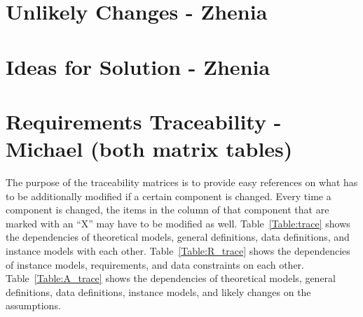 \documentclass[12pt]{article}
\begin{document}
\section{Unlikely Changes - Zhenia}    

\section{Ideas for Solution - Zhenia}

\section{Requirements Traceability - Michael (both matrix tables)}

The purpose of the traceability matrices is to provide easy references on what
has to be additionally modified if a certain component is changed.  Every time a
component is changed, the items in the column of that component that are marked
with an ``X'' may have to be modified as well.  Table~\ref{Table:trace} shows the
dependencies of theoretical models, general definitions, data definitions, and
instance models with each other. Table~\ref{Table:R_trace} shows the
dependencies of instance models, requirements, and data constraints on each
other. Table~\ref{Table:A_trace} shows the dependencies of theoretical models,
general definitions, data definitions, instance models, and likely changes on
the assumptions.



\end{document}
